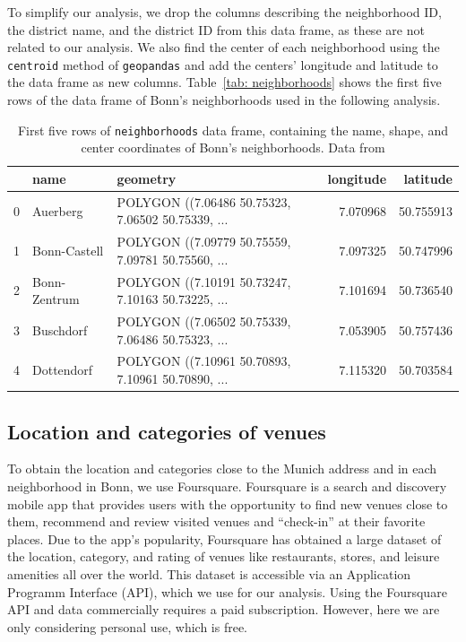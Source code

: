 \documentclass[UKenglish]{scrreprt}
\begin{document}
To simplify our analysis, we drop the columns describing the neighborhood ID, the district name, and the district ID from this data frame, as these are not related to our analysis. We also find the center of each neighborhood using the \verb|centroid| method of \verb|geopandas| and add the centers' longitude and latitude to the data frame as new columns. Table~\ref{tab: neighborhoods} shows the first five rows of the data frame of Bonn's neighborhoods used in the following analysis.

\begin{table}
	\caption[First five rows of neighborhood data]{First five rows of \texttt{neighborhoods} data frame, containing the name, shape, and center coordinates of Bonn's neighborhoods. Data from \cite{Ortsteile}}
	\label{tab:neighborhoods}
	\begin{tabular}{lllrr}
		\toprule
		{} &          name &                                           geometry &  longitude &   latitude \\
		\midrule
		0 &      Auerberg &  POLYGON ((7.06486 50.75323, 7.06502 50.75339, ... &   7.070968 &  50.755913 \\
		1 &  Bonn-Castell &  POLYGON ((7.09779 50.75559, 7.09781 50.75560, ... &   7.097325 &  50.747996 \\
		2 &  Bonn-Zentrum &  POLYGON ((7.10191 50.73247, 7.10163 50.73225, ... &   7.101694 &  50.736540 \\
		3 &     Buschdorf &  POLYGON ((7.06502 50.75339, 7.06486 50.75323, ... &   7.053905 &  50.757436 \\
		4 &    Dottendorf &  POLYGON ((7.10961 50.70893, 7.10961 50.70890, ... &   7.115320 &  50.703584 \\
		\bottomrule
	\end{tabular}
\end{table}


\subsection{Location and categories of venues}
To obtain the location and categories close to the Munich address and in each neighborhood in Bonn, we use Foursquare. 
Foursquare is a search and discovery mobile app that provides users with the opportunity to find new venues close to them, recommend and review visited venues and \enquote{check-in} at their favorite places. Due to the app's popularity, Foursquare has obtained a large dataset of the location, category, and rating of venues like restaurants, stores, and leisure amenities all over the world. This dataset is accessible via an Application Programm Interface (API), which we use for our analysis.
Using the Foursquare API and data commercially requires a paid subscription. However, here we are only considering personal use, which is free. 
\end{document}
